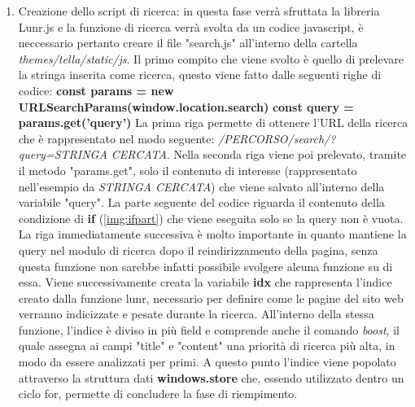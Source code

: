 \documentclass[target=bach,aauheader=]{thud}
\begin{document}
\begin{enumerate}
    \item Creazione dello script di ricerca: in questa fase verrà sfruttata la libreria Lunr.js e la funzione di ricerca verrà svolta da un codice javascript, è neccessario pertanto creare il file "search.js" all'interno della cartella \textit{themes/tella/static/js}.
    \newline \newline 
    Il primo compito che viene svolto è quello di prelevare la stringa inserita come ricerca, questo viene fatto dalle seguenti righe di codice:
    \newline \newline
    \textbf{const params = new URLSearchParams(window.location.search)}
    \newline
    \textbf{const query = params.get('query')}
    \newline \newline
    La prima riga permette di ottenere l'URL della ricerca che è rappresentato nel modo seguente: \textit{/PERCORSO/search/?query=STRINGA CERCATA}.
    \newline
    Nella seconda riga viene poi prelevato, tramite il metodo "params.get", solo il contenuto di interesse (rappresentato nell'esempio da \textit{STRINGA CERCATA}) che viene salvato all'interno della variabile "query".
    \newline \newline
    La parte seguente del codice riguarda il contenuto della condizione di \textbf{if} (\cref{img:ifpart}) che viene eseguita solo se la query non è vuota. La riga immediatamente successiva è molto importante in quanto mantiene la query nel modulo di ricerca dopo il reindirizzamento della pagina, senza questa funzione non sarebbe infatti possibile svolgere alcuna funzione su di essa.
    \newline
    Viene successivamente creata la variabile \textbf{idx} che rappresenta l'indice creato dalla funzione lunr, necessario per definire come le pagine del sito web verranno indicizzate e pesate durante la ricerca.
    \newline
    All'interno della stessa funzione, l'indice è diviso in più field e comprende anche il comando \textit{boost}, il quale assegna ai campi "title" e "content" una priorità di ricerca più alta, in modo da essere analizzati per primi.  
    \newline
    A questo punto l'indice viene popolato attraverso la struttura dati \textbf{windows.store} che, essendo utilizzato dentro un ciclo for, permette di concludere la fase di riempimento.

\end{enumerate}
\end{document}
